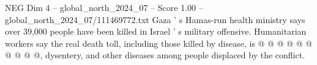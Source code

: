 \begin{textsample}{NEG Dim 4 – global\_north\_2024\_07 – Score 1.00 – global\_north\_2024\_07/111469772.txt}
Gaza ' s Hamas-run health ministry says over 39,000 people have been killed in Israel ' s military offensive.
Humanitarian workers say the real death toll, including those killed by disease, is @ @ @ @ @ @ @ @ @ @, dysentery, and other diseases among people displaced by the conflict.

\end{textsample}
